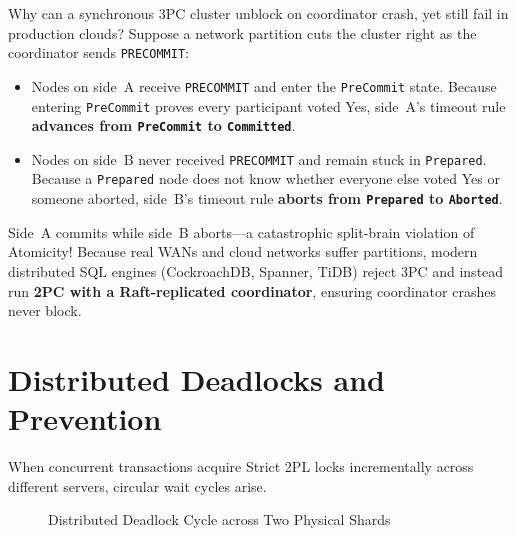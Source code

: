\begin{productionwarningbox}
Why can a synchronous 3PC cluster unblock on coordinator crash, yet still fail in production clouds? Suppose a network partition cuts the cluster right as the coordinator sends \texttt{PRECOMMIT}:
\begin{itemize}[leftmargin=12pt]
  \item Nodes on side~A receive \texttt{PRECOMMIT} and enter the \texttt{PreCommit} state. Because entering \texttt{PreCommit} proves every participant voted Yes, side~A's timeout rule \textbf{advances from \texttt{PreCommit} to \texttt{Committed}}.
  \item Nodes on side~B never received \texttt{PRECOMMIT} and remain stuck in \texttt{Prepared}. Because a \texttt{Prepared} node does not know whether everyone else voted Yes or someone aborted, side~B's timeout rule \textbf{aborts from \texttt{Prepared} to \texttt{Aborted}}.
\end{itemize}
Side~A commits while side~B aborts---a catastrophic split-brain violation of Atomicity! Because real WANs and cloud networks suffer partitions, modern distributed SQL engines (CockroachDB, Spanner, TiDB) reject 3PC and instead run \textbf{2PC with a Raft-replicated coordinator}, ensuring coordinator crashes never block.
\end{productionwarningbox}

\section{Distributed Deadlocks and Prevention}

When concurrent transactions acquire Strict 2PL locks incrementally across different servers, circular wait cycles arise.

\begin{figure}[htbp]
\centering
{}
\caption{Distributed Deadlock Cycle across Two Physical Shards}
\label{fig:v4-ch03-deadlock}
\end{figure}

